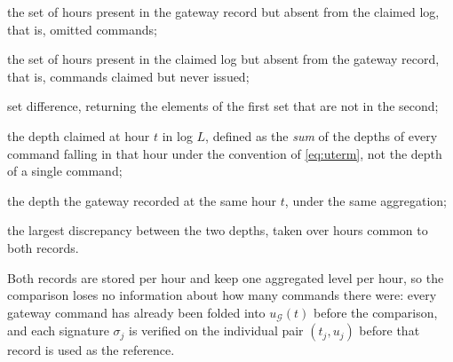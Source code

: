 \begin{symbolist}
\item[$\Delta^{-}$] the set of hours present in the gateway record but absent from the claimed log, that is, omitted commands;
\item[$\Delta^{+}$] the set of hours present in the claimed log but absent from the gateway record, that is, commands claimed but never issued;
\item[$\setminus$] set difference, returning the elements of the first set that are not in the second;
\item[$u(t)$] the depth claimed at hour $t$ in log $L$, defined as the \emph{sum} of the depths of every command falling in that hour under the convention of \eqref{eq:uterm}, not the depth of a single command;
\item[$u_{\mathcal{G}}(t)$] the depth the gateway recorded at the same hour $t$, under the same aggregation;
\item[$\Delta_{\mathrm{depth}}$] the largest discrepancy between the two depths, taken over hours common to both records.
\end{symbolist}
Both records are stored per hour and keep one aggregated level per hour, so the
comparison loses no information about how many commands there were: every gateway
command has already been folded into $u_{\mathcal{G}}(t)$ before the comparison, and
each signature $\sigma_j$ is verified on the individual pair $(t_j,u_j)$ before that
record is used as the reference.

